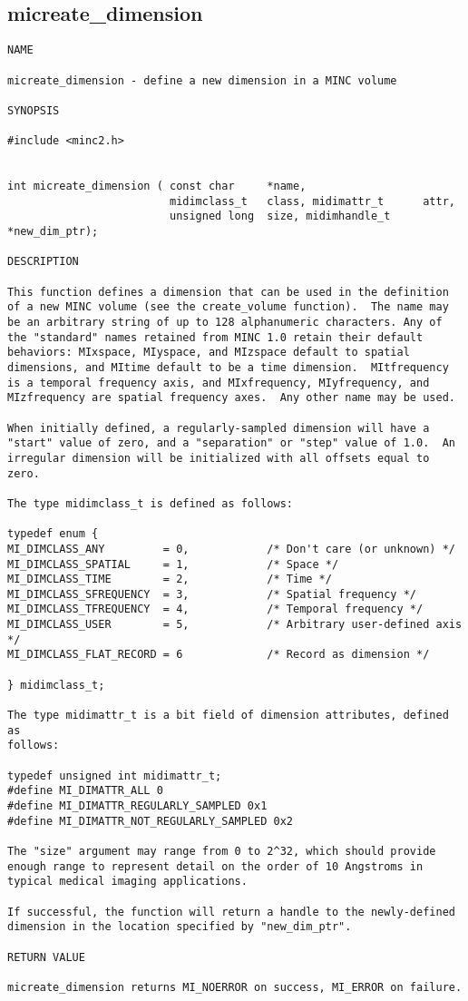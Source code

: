 \documentclass{article}
\begin{document}
\subsection{micreate\_dimension}
\begin{verbatim}
NAME

micreate_dimension - define a new dimension in a MINC volume

SYNOPSIS

#include <minc2.h>


int micreate_dimension ( const char     *name,
                         midimclass_t   class, midimattr_t      attr,
                         unsigned long  size, midimhandle_t     *new_dim_ptr);

DESCRIPTION

This function defines a dimension that can be used in the definition
of a new MINC volume (see the create_volume function).  The name may
be an arbitrary string of up to 128 alphanumeric characters. Any of
the "standard" names retained from MINC 1.0 retain their default
behaviors: MIxspace, MIyspace, and MIzspace default to spatial
dimensions, and MItime default to be a time dimension.  MItfrequency
is a temporal frequency axis, and MIxfrequency, MIyfrequency, and
MIzfrequency are spatial frequency axes.  Any other name may be used.

When initially defined, a regularly-sampled dimension will have a
"start" value of zero, and a "separation" or "step" value of 1.0.  An
irregular dimension will be initialized with all offsets equal to
zero.

The type midimclass_t is defined as follows:

typedef enum { 
MI_DIMCLASS_ANY         = 0,            /* Don't care (or unknown) */
MI_DIMCLASS_SPATIAL     = 1,            /* Space */
MI_DIMCLASS_TIME        = 2,            /* Time */
MI_DIMCLASS_SFREQUENCY  = 3,            /* Spatial frequency */
MI_DIMCLASS_TFREQUENCY  = 4,            /* Temporal frequency */
MI_DIMCLASS_USER        = 5,            /* Arbitrary user-defined axis */
MI_DIMCLASS_FLAT_RECORD = 6             /* Record as dimension */

} midimclass_t;

The type midimattr_t is a bit field of dimension attributes, defined as
follows:

typedef unsigned int midimattr_t; 
#define MI_DIMATTR_ALL 0
#define MI_DIMATTR_REGULARLY_SAMPLED 0x1
#define MI_DIMATTR_NOT_REGULARLY_SAMPLED 0x2

The "size" argument may range from 0 to 2^32, which should provide
enough range to represent detail on the order of 10 Angstroms in
typical medical imaging applications.

If successful, the function will return a handle to the newly-defined
dimension in the location specified by "new_dim_ptr".

RETURN VALUE

micreate_dimension returns MI_NOERROR on success, MI_ERROR on failure.
\end{verbatim}
\end{document}
